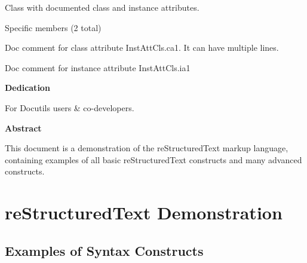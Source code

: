 \documentclass[letterpaper,10pt,english]{sphinxmanual}
\begin{document}

\begin{fulllineitems}
Class with documented class and instance attributes.

Specific members (2 total)

\begin{fulllineitems}
Doc comment for class attribute InstAttCls.ca1.
It can have multiple lines.

\end{fulllineitems}


\begin{fulllineitems}
Doc comment for instance attribute InstAttCls.ia1

\end{fulllineitems}


\end{fulllineitems}

\label{autodoc:module-autodoc_missing_imports}
\begin{SphinxShadowBox}
\textbf{Dedication}

\medskip


For Docutils users \& co-developers.
\end{SphinxShadowBox}

\begin{SphinxShadowBox}
\textbf{Abstract}

\medskip


This document is a demonstration of the reStructuredText markup
language, containing examples of all basic reStructuredText
constructs and many advanced constructs.
\end{SphinxShadowBox}


\chapter{reStructuredText Demonstration}
\label{metadata:restructuredtext-demonstration}\label{metadata::doc}

\section{Examples of Syntax Constructs}
\label{metadata:examples-of-syntax-constructs}
\end{document}
